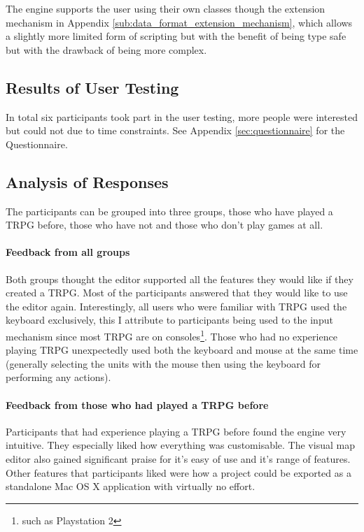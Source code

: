 The engine supports the user using their own classes though the extension mechanism in Appendix \ref{sub:data_format_extension_mechanism}, which allows a slightly more limited form of scripting but with the benefit of being type safe but with the drawback of being  more complex.

% 

\subsection{Results of User Testing}
\label{sub:results_of_user_testing}

In total six participants took part in the user testing, more people were interested but could not due to time constraints.  See Appendix \ref{sec:questionnaire} for the Questionnaire.

\subsection{Analysis of Responses}
The participants can be grouped into three groups, those who have played a TRPG before, those who have not and those who don't play games at all.
\paragraph{Feedback from  all groups\\}
Both groups thought the editor supported all the features they would like if they created a TRPG.  Most of the participants answered that they would like to use the editor again.  Interestingly, all users who were familiar with TRPG used the keyboard exclusively, this I attribute to participants being used to the input mechanism since most TRPG are on consoles\footnote{such as Playstation 2}. Those who had no experience playing TRPG unexpectedly used both the keyboard and mouse at the same time (generally selecting the units with the mouse then using the keyboard for performing any actions).

\paragraph{Feedback from those who had played a TRPG before\\}
Participants that had experience playing a TRPG before found the engine very intuitive. They especially liked how everything was customisable.  The visual map editor also gained significant praise for it's easy of use and it's range of features.  Other features that participants liked were how a project could be exported as a standalone Mac OS X application with virtually no effort. 

